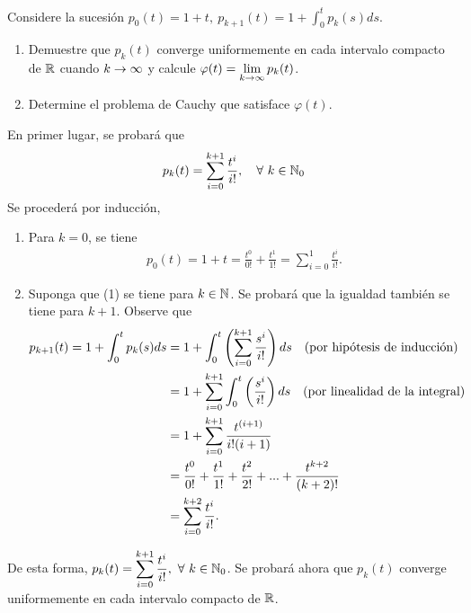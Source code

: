 \documentclass[../template.tex]{subfiles}
\begin{document}
    \begin{enunciado}
        Considere la sucesión $\displaystyle p_0(t) = 1 + t,\ p_{k+1}(t) = 1 + \int_{0}^{t} p_k(s)ds$.
        
        \begin{enumerate}
            \item Demuestre que $p_k(t)$ converge uniformemente en cada intervalo compacto de $\mathbb{R}$ cuando $k \rightarrow \infty$ y calcule $\displaystyle \varphi(t) = \lim_{k \rightarrow \infty} p_k(t)$.
            \item Determine el problema de Cauchy que satisface $\varphi(t)$.
        \end{enumerate}
    \end{enunciado}
    \begin{demostracion}
        En primer lugar, se probará que
        \begin{align}
            p_k(t) = \sum_{i=0}^{k+1} \frac{t^i}{i!}, \quad \forall\ k \in \mathbb{N}_0
        \end{align}
        Se procederá por inducción,
        \begin{enumerate}
            \item Para $k = 0$, se tiene
                \begin{align*}
                    p_0(t) = 1 + t = \frac{t^0}{0!} + \frac{t^1}{1!} = \sum_{i=0}^{1} \frac{t^i}{i!}.
                \end{align*}
            \item Suponga que (1) se tiene para $k \in \mathbb{N}$. Se probará que la igualdad también se tiene para $k+1$. Observe que
                \begin{align*}
                    p_{k+1}(t) = 1 + \int_{0}^{t} p_{k} (s) ds & = 1 + \int_{0}^{t} \left( \sum_{i=0}^{k+1} \frac{s^i}{i!} \right) ds \quad \text{(por hipótesis de inducción)}\\
                    & = 1 + \sum_{i=0}^{k+1} \int_{0}^{t} \left( \frac{s^i}{i!} \right) ds \quad \text{(por linealidad de la integral)}\\
                    &= 1 + \sum_{i=0}^{k+1} \frac{t^{(i+1)}}{i!(i+1)}\\
                    &= \frac{t^0}{0!} + \frac{t^1}{1!} + \frac{t^{2}}{2!} + ... + \frac{t^{k+2}}{(k+2)!}\\
                    &= \sum_{i=0}^{k+2} \frac{t^i}{i!}.
                \end{align*}
        \end{enumerate}
        De esta forma, $\displaystyle p_k(t) = \sum_{i=0}^{k+1} \frac{t^i}{i!}, \ \forall\ k \in \mathbb{N}_0$. Se probará ahora que $p_k(t)$ converge uniformemente en cada intervalo compacto de $\mathbb{R}$. 
        

\end{demostracion}
\end{document}
